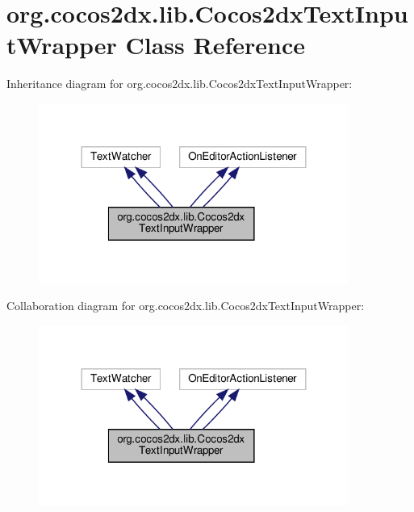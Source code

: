 \hypertarget{classorg_1_1cocos2dx_1_1lib_1_1Cocos2dxTextInputWrapper}{}\section{org.\+cocos2dx.\+lib.\+Cocos2dx\+Text\+Input\+Wrapper Class Reference}
\label{classorg_1_1cocos2dx_1_1lib_1_1Cocos2dxTextInputWrapper}


Inheritance diagram for org.\+cocos2dx.\+lib.\+Cocos2dx\+Text\+Input\+Wrapper\+:
\nopagebreak
\begin{figure}[H]
\begin{center}
\leavevmode
\includegraphics[width=288pt]{classorg_1_1cocos2dx_1_1lib_1_1Cocos2dxTextInputWrapper__inherit__graph}
\end{center}
\end{figure}


Collaboration diagram for org.\+cocos2dx.\+lib.\+Cocos2dx\+Text\+Input\+Wrapper\+:
\nopagebreak
\begin{figure}[H]
\begin{center}
\leavevmode
\includegraphics[width=288pt]{classorg_1_1cocos2dx_1_1lib_1_1Cocos2dxTextInputWrapper__coll__graph}
\end{center}
\end{figure}
